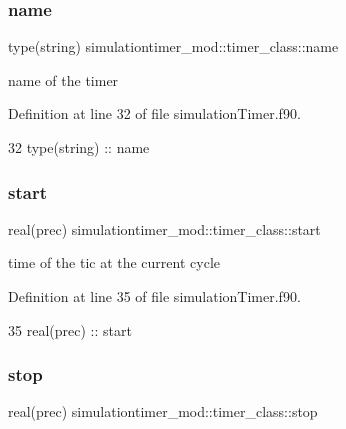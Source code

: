 \subsubsection{\texorpdfstring{name}{name}}
{\footnotesize\ttfamily type(string) simulationtimer\+\_\+mod\+::timer\+\_\+class\+::name\hspace{0.3cm}{\ttfamily [private]}}



name of the timer 



Definition at line 32 of file simulation\+Timer.\+f90.


\begin{DoxyCode}
32         \textcolor{keywordtype}{type}(string) :: name
\end{DoxyCode}
\mbox{\label{structsimulationtimer__mod_1_1timer__class_ad61018be29f7e3ac5ecfa6b2d068e581}} 
\subsubsection{\texorpdfstring{start}{start}}
{\footnotesize\ttfamily real(prec) simulationtimer\+\_\+mod\+::timer\+\_\+class\+::start\hspace{0.3cm}{\ttfamily [private]}}



time of the tic at the current cycle 



Definition at line 35 of file simulation\+Timer.\+f90.


\begin{DoxyCode}
35         \textcolor{keywordtype}{real(prec)} :: start
\end{DoxyCode}
\mbox{\label{structsimulationtimer__mod_1_1timer__class_a96b9fcb1a8e2ae20422e274a025b290d}} 
\subsubsection{\texorpdfstring{stop}{stop}}
{\footnotesize\ttfamily real(prec) simulationtimer\+\_\+mod\+::timer\+\_\+class\+::stop\hspace{0.3cm}{\ttfamily [private]}}



